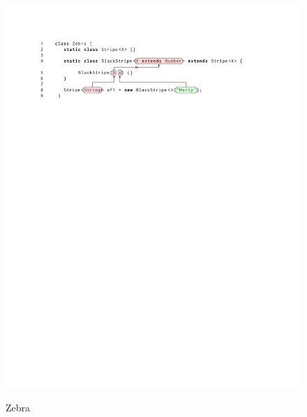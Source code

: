 \documentclass[conference]{IEEEtran}
\begin{document}
\begin{figure}[!t]
    {\includegraphics{zebra_explain_crop}}
  \\

  \caption{Zebra\label{lst:ma}}
\end{figure}
\end{document}
